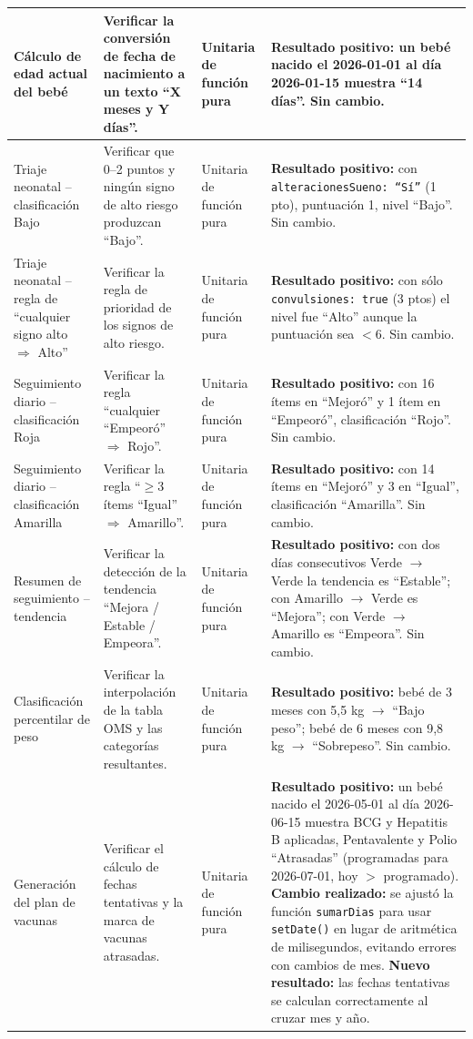 \documentclass[12pt,letterpaper]{article}
\begin{document}
\begin{longtable}{p{}p{}p{}p{}}
Cálculo de edad actual del bebé & Verificar la conversión de fecha de nacimiento a un texto ``X meses y Y días''. & Unitaria de función pura & \textbf{Resultado positivo:} un bebé nacido el 2026-01-01 al día 2026-01-15 muestra ``14 días''. Sin cambio.\\\hline
Triaje neonatal -- clasificación Bajo & Verificar que 0--2 puntos y ningún signo de alto riesgo produzcan ``Bajo''. & Unitaria de función pura & \textbf{Resultado positivo:} con \texttt{alteracionesSueno: ``Sí''} (1 pto), puntuación 1, nivel ``Bajo''. Sin cambio.\\\hline
Triaje neonatal -- regla de ``cualquier signo alto $\Rightarrow$ Alto'' & Verificar la regla de prioridad de los signos de alto riesgo. & Unitaria de función pura & \textbf{Resultado positivo:} con sólo \texttt{convulsiones: true} (3 ptos) el nivel fue ``Alto'' aunque la puntuación sea $<$6. Sin cambio.\\\hline
Seguimiento diario -- clasificación Roja & Verificar la regla ``cualquier ``Empeoró'' $\Rightarrow$ Rojo''. & Unitaria de función pura & \textbf{Resultado positivo:} con 16 ítems en ``Mejoró'' y 1 ítem en ``Empeoró'', clasificación ``Rojo''. Sin cambio.\\\hline
Seguimiento diario -- clasificación Amarilla & Verificar la regla ``$\geq$3 ítems ``Igual'' $\Rightarrow$ Amarillo''. & Unitaria de función pura & \textbf{Resultado positivo:} con 14 ítems en ``Mejoró'' y 3 en ``Igual'', clasificación ``Amarilla''. Sin cambio.\\\hline
Resumen de seguimiento -- tendencia & Verificar la detección de la tendencia ``Mejora / Estable / Empeora''. & Unitaria de función pura & \textbf{Resultado positivo:} con dos días consecutivos Verde $\to$ Verde la tendencia es ``Estable''; con Amarillo $\to$ Verde es ``Mejora''; con Verde $\to$ Amarillo es ``Empeora''. Sin cambio.\\\hline
Clasificación percentilar de peso & Verificar la interpolación de la tabla OMS y las categorías resultantes. & Unitaria de función pura & \textbf{Resultado positivo:} bebé de 3 meses con 5,5 kg $\to$ ``Bajo peso''; bebé de 6 meses con 9,8 kg $\to$ ``Sobrepeso''. Sin cambio.\\\hline
Generación del plan de vacunas & Verificar el cálculo de fechas tentativas y la marca de vacunas atrasadas. & Unitaria de función pura & \textbf{Resultado positivo:} un bebé nacido el 2026-05-01 al día 2026-06-15 muestra BCG y Hepatitis B aplicadas, Pentavalente y Polio ``Atrasadas'' (programadas para 2026-07-01, hoy $>$ programado). \textbf{Cambio realizado:} se ajustó la función \texttt{sumarDias} para usar \texttt{setDate()} en lugar de aritmética de milisegundos, evitando errores con cambios de mes. \textbf{Nuevo resultado:} las fechas tentativas se calculan correctamente al cruzar mes y año.\\\hline

\end{longtable}
\end{document}
